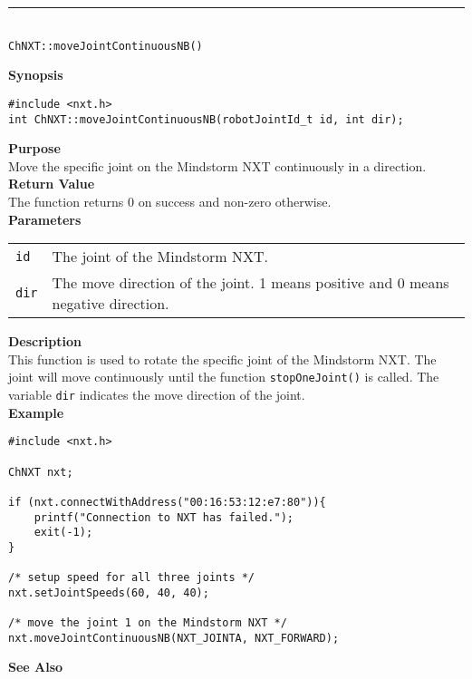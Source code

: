 \noindent
\vspace{5pt}
\rule{4.5in}{0.015in}\\
\noindent
{\LARGE \texttt{ChNXT::moveJointContinuousNB()} }\\


\noindent
{\bf Synopsis}
\begin{lstlisting}
#include <nxt.h>
int ChNXT::moveJointContinuousNB(robotJointId_t id, int dir);
\end{lstlisting}

\noindent
{\bf Purpose}\\
Move the specific joint on the Mindstorm NXT continuously in a direction.\\

\noindent
{\bf Return Value}\\
The function returns 0 on success and non-zero otherwise.\\

\noindent
{\bf Parameters}\\
\vspace{-0.1in}
\begin{description}
\item               
\begin{tabular}{p{15 mm}p{125 mm}}
\texttt{id}      &The joint of the Mindstorm NXT.\\
\texttt{dir}     &The move direction of the joint. 1 means positive and 0 means negative direction.\\
\end{tabular}
\end{description}

\noindent
{\bf Description}\\
This function is used to rotate the specific joint of the Mindstorm NXT. The joint will move continuously until the function 
\texttt{stopOneJoint()} is called. The variable \texttt{dir} indicates the move direction of the joint. \\


\noindent
{\bf Example}
\begin{lstlisting}
#include <nxt.h> 

ChNXT nxt;

if (nxt.connectWithAddress("00:16:53:12:e7:80")){
    printf("Connection to NXT has failed.");
    exit(-1);
}
 
/* setup speed for all three joints */
nxt.setJointSpeeds(60, 40, 40);

/* move the joint 1 on the Mindstorm NXT */
nxt.moveJointContinuousNB(NXT_JOINTA, NXT_FORWARD);
\end{lstlisting}

\noindent
{\bf See Also}\\
